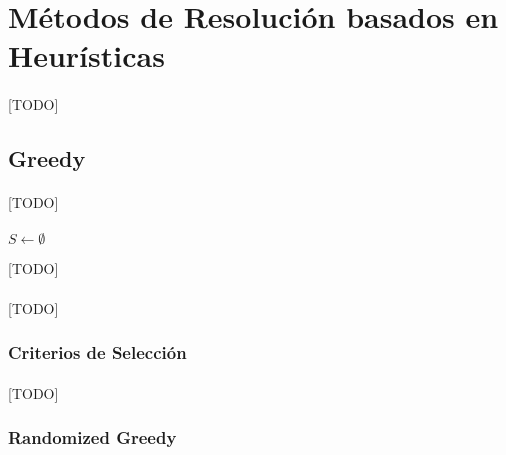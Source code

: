 \documentclass{subfiles}
\begin{document}
    \section{Métodos de Resolución basados en Heurísticas}
    \label{sec:solving_heuristics}

      \paragraph{}
      [TODO]

      \subsection{Greedy}
      \label{sec:solving_greedy}

        \paragraph{}
        [TODO]


        \paragraph{}
        \begin{algorithm}
          \SetAlgoLined
          $S \gets \emptyset$\;
          \caption{[TODO]}
          \label{code:solving_greedy}
        \end{algorithm}


        \paragraph{}
        [TODO]

        \subsubsection{Criterios de Selección}
        \label{sec:solving_greedy_criterions}

          \paragraph{}
          [TODO]

        \subsubsection{Randomized Greedy}
        \label{sec:solving_randomized_greedy}
\end{document}
